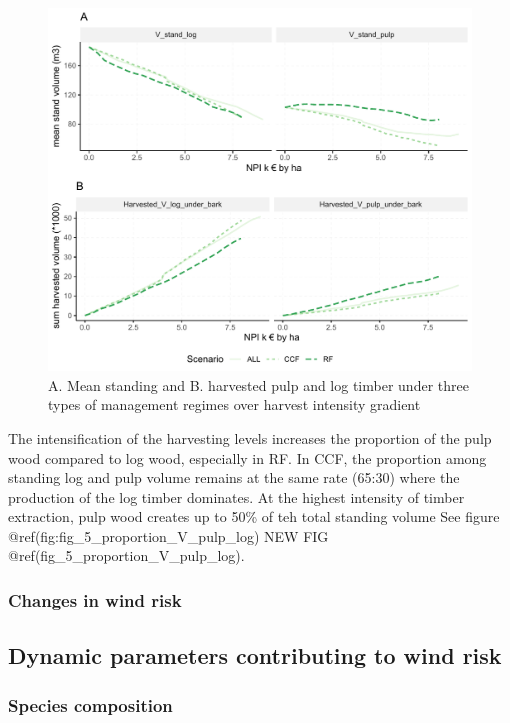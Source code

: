 \documentclass[]{elsarticle} %
\makeatletter
\def\maxwidth{\ifdim\Gin@nat@width>\linewidth\linewidth
\else\Gin@nat@width\fi}
\let\Oldincludegraphics\includegraphics
\renewcommand{\includegraphics}[1]{\Oldincludegraphics[width=\maxwidth]{#1}}
\makeatother
\begin{document}
\begin{figure}
\centering
\includegraphics{test_manus_files/figure-latex/fig_4_plot_V_timber-1.pdf}
\caption{A. Mean standing and B. harvested pulp and log timber under
three types of management regimes over harvest intensity gradient}
\end{figure}

The intensification of the harvesting levels increases the proportion of
the pulp wood compared to log wood, especially in RF. In CCF, the
proportion among standing log and pulp volume remains at the same rate
(65:30) where the production of the log timber dominates. At the highest
intensity of timber extraction, pulp wood creates up to 50\% of teh
total standing volume See figure
@ref(fig:fig\_5\_proportion\_V\_pulp\_log) NEW FIG
@ref(fig\_5\_proportion\_V\_pulp\_log).

\subsubsection{Changes in wind risk}\label{changes-in-wind-risk}

\subsection{Dynamic parameters contributing to wind
risk}\label{dynamic-parameters-contributing-to-wind-risk}

\subsubsection{Species composition}\label{species-composition}
\end{document}
